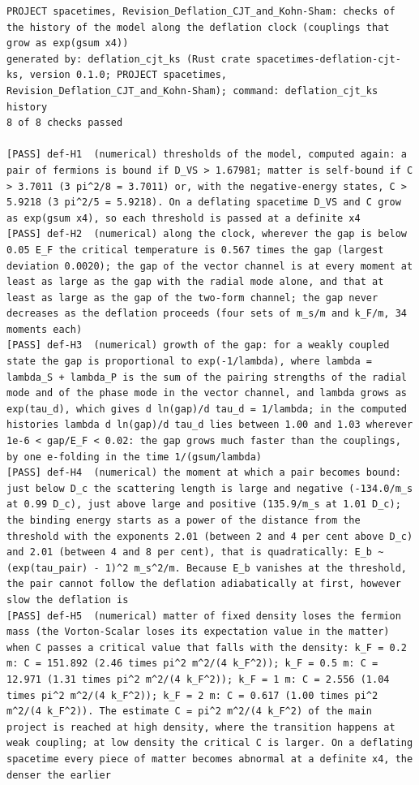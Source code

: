 \documentclass[
  10pt,
]{article}
\begin{document}
\begin{verbatim}
PROJECT spacetimes, Revision_Deflation_CJT_and_Kohn-Sham: checks of the history of the model along the deflation clock (couplings that grow as exp(gsum x4))
generated by: deflation_cjt_ks (Rust crate spacetimes-deflation-cjt-ks, version 0.1.0; PROJECT spacetimes, Revision_Deflation_CJT_and_Kohn-Sham); command: deflation_cjt_ks history
8 of 8 checks passed

[PASS] def-H1  (numerical) thresholds of the model, computed again: a pair of fermions is bound if D_VS > 1.67981; matter is self-bound if C > 3.7011 (3 pi^2/8 = 3.7011) or, with the negative-energy states, C > 5.9218 (3 pi^2/5 = 5.9218). On a deflating spacetime D_VS and C grow as exp(gsum x4), so each threshold is passed at a definite x4
[PASS] def-H2  (numerical) along the clock, wherever the gap is below 0.05 E_F the critical temperature is 0.567 times the gap (largest deviation 0.0020); the gap of the vector channel is at every moment at least as large as the gap with the radial mode alone, and that at least as large as the gap of the two-form channel; the gap never decreases as the deflation proceeds (four sets of m_s/m and k_F/m, 34 moments each)
[PASS] def-H3  (numerical) growth of the gap: for a weakly coupled state the gap is proportional to exp(-1/lambda), where lambda = lambda_S + lambda_P is the sum of the pairing strengths of the radial mode and of the phase mode in the vector channel, and lambda grows as exp(tau_d), which gives d ln(gap)/d tau_d = 1/lambda; in the computed histories lambda d ln(gap)/d tau_d lies between 1.00 and 1.03 wherever 1e-6 < gap/E_F < 0.02: the gap grows much faster than the couplings, by one e-folding in the time 1/(gsum/lambda)
[PASS] def-H4  (numerical) the moment at which a pair becomes bound: just below D_c the scattering length is large and negative (-134.0/m_s at 0.99 D_c), just above large and positive (135.9/m_s at 1.01 D_c); the binding energy starts as a power of the distance from the threshold with the exponents 2.01 (between 2 and 4 per cent above D_c) and 2.01 (between 4 and 8 per cent), that is quadratically: E_b ~ (exp(tau_pair) - 1)^2 m_s^2/m. Because E_b vanishes at the threshold, the pair cannot follow the deflation adiabatically at first, however slow the deflation is
[PASS] def-H5  (numerical) matter of fixed density loses the fermion mass (the Vorton-Scalar loses its expectation value in the matter) when C passes a critical value that falls with the density: k_F = 0.2 m: C = 151.892 (2.46 times pi^2 m^2/(4 k_F^2)); k_F = 0.5 m: C = 12.971 (1.31 times pi^2 m^2/(4 k_F^2)); k_F = 1 m: C = 2.556 (1.04 times pi^2 m^2/(4 k_F^2)); k_F = 2 m: C = 0.617 (1.00 times pi^2 m^2/(4 k_F^2)). The estimate C = pi^2 m^2/(4 k_F^2) of the main project is reached at high density, where the transition happens at weak coupling; at low density the critical C is larger. On a deflating spacetime every piece of matter becomes abnormal at a definite x4, the denser the earlier

\end{verbatim}
\end{document}
